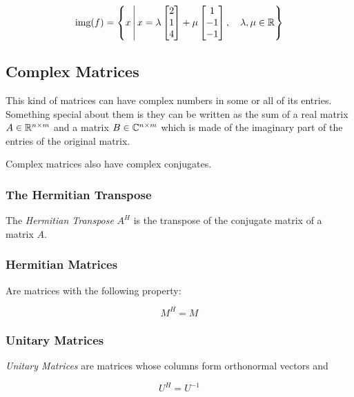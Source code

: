 \[
    \text{img}(f) =
    \left\{
    x \, \middle| \, x = \lambda
    \begin{bmatrix}
    2 \\
    1 \\
    4
    \end{bmatrix} + \mu
    \begin{bmatrix}
    1 \\
    -1 \\
    -1
    \end{bmatrix}
    , \quad \lambda, \mu \in \mathbb{R}
    \right\}
\]

\subsection{Complex Matrices}

This kind of matrices can have complex numbers in some or all of its entries. Something 
special about them is they can be written as the sum of a real matrix \(A \in \mathbb{R}^{n \times m}\) and 
a matrix \(B \in \mathbb{C}^{n \times m}\) which is made of the imaginary part of the entries of the original 
matrix.

Complex matrices also have complex conjugates.


\subsubsection{The Hermitian Transpose}

The \emph{Hermitian Transpose} \(A^H\) is the transpose of the conjugate matrix of a matrix \(A\).

\subsubsection{Hermitian Matrices}

Are matrices with the following property:

\[
    M^H = M
\]

\subsubsection{Unitary Matrices}

\emph{Unitary Matrices} are matrices whose columns form orthonormal vectors and 

\[
    U^H = U^{-1}
\]